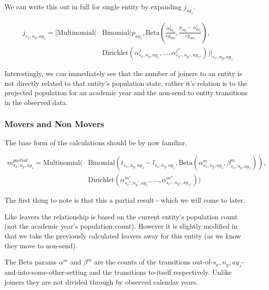 \documentclass[margin=5mm]{article}
\begin{document}
We can write this out in full for single entity by expanding
$j_{ay_z}$.

\begin{equation*}
  \begin{split}
j_{s_x,n_y,ay_z} = \bigg[\text{Multinomial}( & \text{Binomial}(p_{ay_z},
\text{Beta}(\frac{\alpha^j_{ay_z}}{cy_{obs}},\frac{p_{ay_z} -\alpha^j_{ay_z}}{cy_{obs}}), \\
& \text{Dirichlet}(\alpha^{j}_{s_x,n_y,ay_z}, \dots
, \alpha^{j''}_{s_{x''},n_{y''},ay_{z''}}))\bigg]_{s_x,n_y,ay_z}
  \end{split}
\end{equation*}

Interestingly, we can immediately see that the number of joiners to an
entity is not directly related to that entity's population state,
rather it's relation is to the projected population for an academic year
and the non-send to entity transitions in the observed data.

\subsubsection{Movers and Non Movers}


The base form of the calculations should be by now familiar.

\begin{equation*}
  \begin{split}
m^{partial}_{s_x,n_y,ay_z} =
\text{Multinomial}( & \text{Binomial}(t_{s_x,n_y,ay_z} - l_{s_x,n_y,ay_z}, 
 \text{Beta}(\alpha^m_{s_x,n_y,ay_z},\beta^m_{s_x,n_y,ay_z})),
\\ &  \text{Dirichlet}(\alpha^{m'}_{s_x',n_y',ay_z'}, \dots,
\alpha^{m''}_{s_{x''},n_{y''},ay_{z''}}))
\end{split}
\end{equation*}

The first thing to note is that this a partial result - which we will
come to later.

Like leavers the relationship is based on the current entity's
population count (not the academic year's population count).  However
it is slightly modified in that we take the previously calculated
leavers away for this entity (as we know they move to non-send).

The Beta params $\alpha^m$ and $\beta^m$ are the counts of the
transitions out-of-${s_x,n_y,ay_z}$-and-into-some-other-setting and the
transitions to-itself respectively.  Unlike joiners they are not
divided through by observed calendar years.
\end{document}
